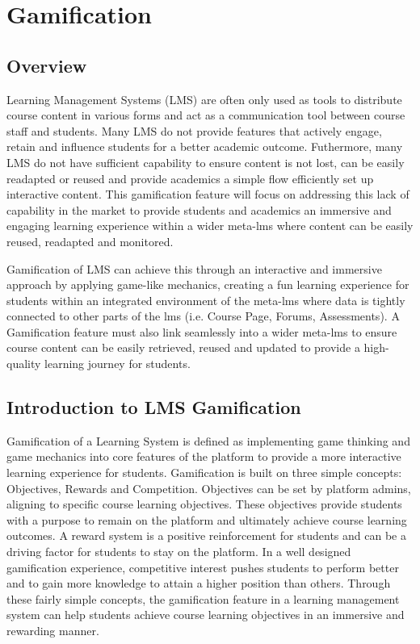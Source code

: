 \section{Gamification}
\subsection{Overview}
Learning Management Systems (LMS) are often only used as tools to distribute course content in various forms and act as a communication tool between course staff and students. Many LMS do not provide features that actively engage, retain and influence students for a better academic outcome. Futhermore, many LMS do not have sufficient capability to ensure content is not lost, can be easily readapted or reused and provide academics a simple flow efficiently set up interactive content. This gamification feature will focus on addressing this lack of capability in the market to provide students and academics an immersive and engaging learning experience within a wider meta-lms where content can be easily reused, readapted and monitored.
\newline

Gamification of LMS can achieve this through an interactive and immersive approach by applying game-like mechanics, creating a fun learning experience for students within an integrated environment of the meta-lms where data is tightly connected to other parts of the lms (i.e. Course Page, Forums, Assessments).
A Gamification feature must also link seamlessly into a wider meta-lms to ensure course content can be easily retrieved, reused and updated to provide a high-quality learning journey for students.

\subsection{Introduction to LMS Gamification}
Gamification of a Learning System is defined as implementing game thinking and game mechanics into core features of the platform to provide a more interactive learning experience for students. Gamification is built on three simple concepts: Objectives, Rewards and Competition. Objectives can be set by platform admins, aligning to specific course learning objectives. 
These objectives provide students with a purpose to remain on the platform and ultimately achieve course learning outcomes. A reward system is a positive reinforcement for students and can be a driving factor for students to stay on the platform. In a well designed gamification experience, competitive interest pushes students to perform better and to gain more knowledge to attain a higher position than others. 
Through these fairly simple concepts, the gamification feature in a learning management system can help students achieve course learning objectives in an immersive and rewarding manner.

